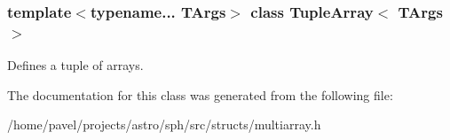\subsubsection*{template$<$typename... T\+Args$>$\newline
class Tuple\+Array$<$ T\+Args $>$}

Defines a tuple of arrays. 

The documentation for this class was generated from the following file\+:\begin{DoxyCompactItemize}
\item 
/home/pavel/projects/astro/sph/src/structs/multiarray.\+h\end{DoxyCompactItemize}
